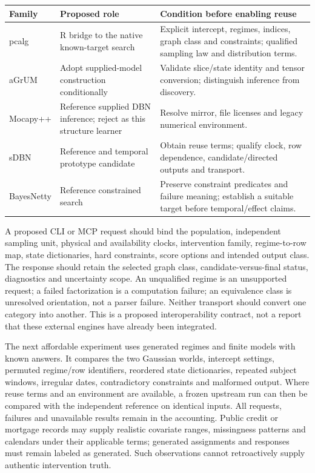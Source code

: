\begin{longtable}{P{0.15\textwidth}P{0.34\textwidth}P{0.43\textwidth}}
\toprule
Family & Proposed role & Condition before enabling reuse\\
\midrule
\endhead
pcalg & R bridge to the native known-target search & Explicit intercept, regimes,
indices, graph class and constraints; qualified sampling law and distribution terms.\\
aGrUM & Adopt supplied-model construction conditionally & Validate slice/state
identity and tensor conversion; distinguish inference from discovery.\\
Mocapy++ & Reference supplied DBN inference; reject as this structure learner &
Resolve mirror, file licenses and legacy numerical environment.\\
sDBN & Reference and temporal prototype candidate & Obtain reuse terms; qualify
clock, row dependence, candidate/directed outputs and transport.\\
BayesNetty & Reference constrained search & Preserve constraint predicates and
failure meaning; establish a suitable target before temporal/effect claims.\\
\bottomrule
\end{longtable}

A proposed CLI or MCP request should bind the population, independent sampling
unit, physical and availability clocks, intervention family, regime-to-row map,
state dictionaries, hard constraints, score options and intended output class.
The response should retain the selected graph class, candidate-versus-final
status, diagnostics and uncertainty scope. An unqualified regime is an
unsupported request; a failed factorization is a computation failure; an
equivalence class is unresolved orientation, not a parser failure. Neither
transport should convert one category into another. This is a proposed
interoperability contract, not a report that these external engines have
already been integrated. \citep{exec16_ct_design}

The next affordable experiment uses generated regimes and finite models with
known answers. It compares the two Gaussian worlds, intercept settings,
permuted regime/row identifiers, reordered state dictionaries, repeated subject
windows, irregular dates, contradictory constraints and malformed output.
Where reuse terms and an environment are available, a frozen upstream run can
then be compared with the independent reference on identical inputs. All
requests, failures and unavailable results remain in the accounting. Public
credit or mortgage records may supply realistic covariate ranges, missingness
patterns and calendars under their applicable terms; generated assignments
and responses must remain labeled as generated. Such observations cannot
retroactively supply authentic intervention truth.


